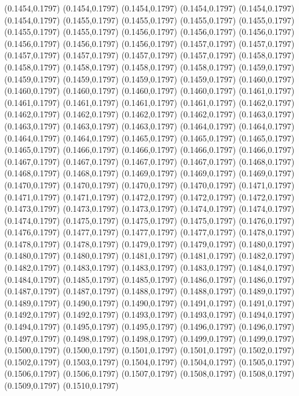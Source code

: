 (0.1454,0.1797)
(0.1454,0.1797)
(0.1454,0.1797)
(0.1454,0.1797)
(0.1454,0.1797)
(0.1454,0.1797)
(0.1455,0.1797)
(0.1455,0.1797)
(0.1455,0.1797)
(0.1455,0.1797)
(0.1455,0.1797)
(0.1455,0.1797)
(0.1456,0.1797)
(0.1456,0.1797)
(0.1456,0.1797)
(0.1456,0.1797)
(0.1456,0.1797)
(0.1456,0.1797)
(0.1457,0.1797)
(0.1457,0.1797)
(0.1457,0.1797)
(0.1457,0.1797)
(0.1457,0.1797)
(0.1457,0.1797)
(0.1458,0.1797)
(0.1458,0.1797)
(0.1458,0.1797)
(0.1458,0.1797)
(0.1458,0.1797)
(0.1459,0.1797)
(0.1459,0.1797)
(0.1459,0.1797)
(0.1459,0.1797)
(0.1459,0.1797)
(0.1460,0.1797)
(0.1460,0.1797)
(0.1460,0.1797)
(0.1460,0.1797)
(0.1460,0.1797)
(0.1461,0.1797)
(0.1461,0.1797)
(0.1461,0.1797)
(0.1461,0.1797)
(0.1461,0.1797)
(0.1462,0.1797)
\PST@Solid(0.1462,0.1797)
(0.1462,0.1797)
(0.1462,0.1797)
(0.1462,0.1797)
(0.1463,0.1797)
(0.1463,0.1797)
(0.1463,0.1797)
(0.1463,0.1797)
(0.1464,0.1797)
(0.1464,0.1797)
(0.1464,0.1797)
(0.1464,0.1797)
(0.1465,0.1797)
(0.1465,0.1797)
(0.1465,0.1797)
(0.1465,0.1797)
(0.1466,0.1797)
(0.1466,0.1797)
(0.1466,0.1797)
(0.1466,0.1797)
(0.1467,0.1797)
(0.1467,0.1797)
(0.1467,0.1797)
(0.1467,0.1797)
(0.1468,0.1797)
(0.1468,0.1797)
(0.1468,0.1797)
(0.1469,0.1797)
(0.1469,0.1797)
(0.1469,0.1797)
(0.1470,0.1797)
(0.1470,0.1797)
(0.1470,0.1797)
(0.1470,0.1797)
(0.1471,0.1797)
(0.1471,0.1797)
(0.1471,0.1797)
(0.1472,0.1797)
(0.1472,0.1797)
(0.1472,0.1797)
(0.1473,0.1797)
(0.1473,0.1797)
(0.1473,0.1797)
(0.1474,0.1797)
(0.1474,0.1797)
(0.1474,0.1797)
(0.1475,0.1797)
(0.1475,0.1797)
(0.1475,0.1797)
(0.1476,0.1797)
(0.1476,0.1797)
(0.1477,0.1797)
(0.1477,0.1797)
(0.1477,0.1797)
(0.1478,0.1797)
(0.1478,0.1797)
(0.1478,0.1797)
(0.1479,0.1797)
(0.1479,0.1797)
(0.1480,0.1797)
(0.1480,0.1797)
(0.1480,0.1797)
(0.1481,0.1797)
(0.1481,0.1797)
(0.1482,0.1797)
(0.1482,0.1797)
(0.1483,0.1797)
(0.1483,0.1797)
(0.1483,0.1797)
(0.1484,0.1797)
(0.1484,0.1797)
(0.1485,0.1797)
(0.1485,0.1797)
(0.1486,0.1797)
(0.1486,0.1797)
(0.1487,0.1797)
(0.1487,0.1797)
(0.1488,0.1797)
(0.1488,0.1797)
(0.1489,0.1797)
(0.1489,0.1797)
(0.1490,0.1797)
(0.1490,0.1797)
(0.1491,0.1797)
(0.1491,0.1797)
(0.1492,0.1797)
(0.1492,0.1797)
(0.1493,0.1797)
(0.1493,0.1797)
(0.1494,0.1797)
(0.1494,0.1797)
(0.1495,0.1797)
(0.1495,0.1797)
(0.1496,0.1797)
(0.1496,0.1797)
(0.1497,0.1797)
(0.1498,0.1797)
(0.1498,0.1797)
(0.1499,0.1797)
(0.1499,0.1797)
(0.1500,0.1797)
\PST@Solid(0.1500,0.1797)
(0.1501,0.1797)
(0.1501,0.1797)
(0.1502,0.1797)
(0.1502,0.1797)
(0.1503,0.1797)
(0.1504,0.1797)
(0.1504,0.1797)
(0.1505,0.1797)
(0.1506,0.1797)
(0.1506,0.1797)
(0.1507,0.1797)
(0.1508,0.1797)
(0.1508,0.1797)
(0.1509,0.1797)
(0.1510,0.1797)

